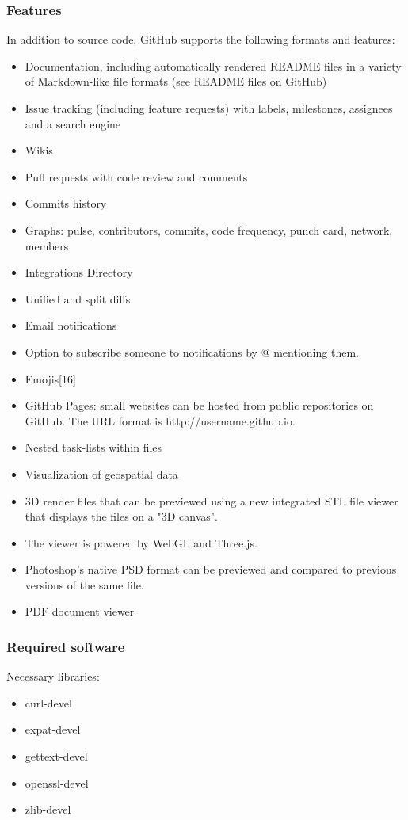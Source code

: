 \documentclass[12pt]{article}
\begin{document}
\subsubsection{Features}
In addition to source code, GitHub supports the following formats and features:
\begin{itemize}
\item Documentation, including automatically rendered README files in a variety of Markdown-like file formats (see README files on GitHub)
\item Issue tracking (including feature requests) with labels, milestones, assignees and a search engine
\item Wikis
\item Pull requests with code review and comments
\item Commits history
\item Graphs: pulse, contributors, commits, code frequency, punch card, network, members
\item Integrations Directory
\item Unified and split diffs
\item Email notifications
\item Option to subscribe someone to notifications by @ mentioning them.
\item Emojis[16]
\item GitHub Pages: small websites can be hosted from public repositories on GitHub. The URL format is http://username.github.io.
\item Nested task-lists within files
\item Visualization of geospatial data
\item 3D render files that can be previewed using a new integrated STL file viewer that displays the files on a "3D canvas". \item The viewer is powered by WebGL and Three.js.
\item Photoshop's native PSD format can be previewed and compared to previous versions of the same file.
\item PDF document viewer
\end{itemize}

\subsubsection{Required software}
\par Necessary libraries:
\begin{itemize}
	\item curl-devel 
	\item expat-devel 
	\item gettext-devel 
	\item openssl-devel
	\item zlib-devel
\end{itemize}
\end{document}
